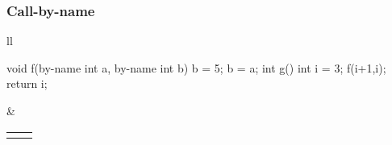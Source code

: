 \documentclass{beamer}
\begin{document}
\begin{frame}[fragile]
\frametitle{Call-by-name}


\begin{tabular}{ll}
\begin{minipage}{4.5cm}
\begin{cplus3}

void f(by-name int a, by-name int b) 
{
    b = 5;
    b = a;
}
int g() {
    int i = 3;
    f(i+1,i);
    return i;
}
\end{cplus3}


\end{minipage}
& 
\begin{tabular}{ll}
{\small 
\begin{tikzpicture}

\draw (0,0.5)  rectangle (1.2,1.0);
\pgftext[at={\pgfpoint{0.6cm}{0.75cm}}]{prev} ;

\draw (0,1.0)  rectangle (1.2,1.5);
\pgftext[at={\pgfpoint{0.5cm}{1.25cm}}]{ret } ;

\draw (0,1.5)  rectangle (1.2,2.0);
\pgftext[at={\pgfpoint{0.5cm}{1.75cm}}]{a} ;
\draw[->] (1.0, 1.7) .. controls (1.2, 2.7) and (1.8, 2.9) .. (2,3);

\draw (0,2.0)  rectangle (1.2,2.5);
\pgftext[at={\pgfpoint{0.5cm}{2.25cm}}]{b} ;
\draw[->] (1.0, 2.2) .. controls (1.2, 3.6) and (1.8, 3.9) .. (2,4);

\end{tikzpicture}
}
&
{\small 
\begin{tikzpicture}
\draw (0,0)  rectangle (1.2,0.5);
\pgftext[at={\pgfpoint{0.5cm}{0.25cm}}]{res:?} ;

\draw (0,0.5)  rectangle (1.2,1.0);
\pgftext[at={\pgfpoint{0.6cm}{0.75cm}}]{prev} ;

\draw (0,1.0)  rectangle (1.2,1.5);
\pgftext[at={\pgfpoint{0.5cm}{1.25cm}}]{ret} ;

\draw (0,1.5)  rectangle (1.2,2.0);
\pgftext[at={\pgfpoint{0.5cm}{1.75cm}}]{i: 3} ;

\draw (0,2.5) ellipse (20pt and 10pt);
\pgftext[at={\pgfpoint{0.2cm}{2.5cm}}]{i+1} ;
\draw[->] (0.4,2.5) .. controls (1.4, 2.3) and (2.5,2.0) .. (1.3,1.8);

\draw (0,3.5) ellipse (20pt and 10pt);
\pgftext[at={\pgfpoint{0.1cm}{3.5cm}}]{i} ;
\draw[->] (0.4,3.5) .. controls (1.4, 3.3) and (2.6,2.0) .. (1.3,1.7);

\end{tikzpicture}
}
\end{tabular}
\end{tabular}


\end{frame}
\end{document}
